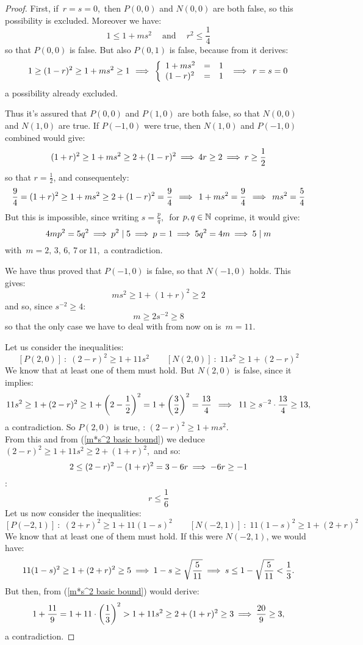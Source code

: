 \begin{proof}
First, if\, $r = s = 0$,\, then $P(0,0)$ and $N(0,0)$
are both false, so this possibility is excluded.
Moreover we have:
$$
1 \leq 1 + ms^2 \quad\: \textrm{and}
\quad\: r^2 \leq \frac{1}{4}
$$
so that $P(0,0)$ is false.
But also $P(0,1)$ is false, because from it derives:
$$
1 \geq (1 - r)^2 \geq 1 + ms^2 \geq 1 \,\:\Longrightarrow\:\,
\left\{
\begin{array}{lll}
1 + ms^2 & = & 1 \\
(1 - r)^2 & = & 1
\end{array}
\,\:\Longrightarrow\:\,
r = s = 0
\right.
$$
a possibility already excluded.

Thus it's assured that $P(0,0)$ and $P(1,0)$ are both
false, so that $N(0,0)$ and $N(1,0)$ are true.
If $P(-1, 0)$ were true, then $N(1, 0)$ and
$P(-1, 0)$ combined would give:
$$
(1 + r)^2 \geq 1 + ms^2 \geq 2 + (1 - r)^2 \:\Longrightarrow\:
4r \geq 2 \:\Longrightarrow\: r \geq \frac{1}{2}
$$
so that $r = \frac{1}{2}$, and consequentely:
$$
\frac{9}{4} = (1 + r)^2 \geq 1 + ms^2 \geq
2 + (1 - r)^2 = \frac{9}{4} \:\:\Longrightarrow\:\:
1 + ms^2 = \frac{9}{4} \:\:\Longrightarrow\:\: ms^2 = \frac{5}{4}
$$
But this is impossible, since writing
$s = \frac{p}{q},\,$ for $p, q \in \mathbb{N}$ coprime,
it would give:
$$
4mp^2 = 5q^2 \:\Longrightarrow\: p^2 \mid 5 \:\Longrightarrow\: p = 1
\:\Longrightarrow\: 5q^2 = 4m \:\Longrightarrow\: 5 \mid m
$$
with\, $m = 2,\, 3,\, 6,\, 7\ \textrm{or}\ 11$,\,
a contradiction.

We have thus proved that $P(-1, 0)$ is false, so that
$N(-1, 0)$ holds. This gives:
%
\begin{equation}\label{m*s^2 basic bound}
ms^2 \geq 1 + (1 + r)^2 \geq 2
\end{equation}
and so, since $s^{-2} \geq 4$:
$$ m \geq 2s^{-2} \geq 8 $$
so that the only case we have to deal with from now on
is\, $m = 11$.

Let us consider the inequalities:
$$
\left[P(2,0)\right]\::\; (2 - r)^2 \geq 1 + 11s^2
\quad\quad
\left[N(2,0)\right]\::\; 11s^2 \geq 1 + (2 - r)^2
$$
We know that at least one of them must hold.
But $N(2,0)$ is false, since it implies:
$$
11s^2 \geq 1 + (2 - r)^2 \geq 1 + \left(2 - \frac{1}{2}\right)^2
= 1 + \left(\frac{3}{2}\right)^2 = \frac{13}{4}
\;\:\Longrightarrow\:\; 11 \geq s^{-2}\cdot \frac{13}{4} \geq 13,
$$
a contradiction. So $P(2,0)$ is true, \ie:\:
$(2 - r)^2 \geq 1 +ms^2$.\\
From this and from (\ref{m*s^2 basic bound}) we deduce\,
$(2 - r)^2 \geq 1 + 11s^2 \geq 2 + (1 + r)^2$,\, and so:
$$
2 \leq (2 - r)^2 - (1 + r)^2 = 3 - 6r \:\Longrightarrow\: - 6r \geq -1
$$
\ie:
\begin{equation}\label{r_upper_bound_1}
r \leq \frac{1}{6}
\end{equation}
%
Let us now consider the inequalities:
$$
\left[P(-2,1)\right]\::\; (2 + r)^2 \geq 1 + 11(1 - s)^2
\quad\quad
\left[N(-2,1)\right]\::\; 11(1 - s)^2 \geq 1 + (2 + r)^2
$$
We know that at least one of them must hold.
If this were $N(-2, 1)$, we would have:
$$
11(1 - s)^2 \geq 1 + (2 + r)^2 \geq 5 \:\Longrightarrow\:
1 - s \geq \sqrt{\frac{5}{11}} \:\Longrightarrow\:
s \leq 1 - \sqrt{\frac{5}{11}} < \frac{1}{3}.
$$
\medskip
But then, from (\ref{m*s^2 basic bound}) would derive:
$$
1 + \frac{11}{9}= 1 + 11 \cdot \left(\frac{1}{3}\right)^2 >
1 + 11s^2 \geq 2 + (1 + r)^2 \geq 3
\:\Longrightarrow\: \frac{20}{9} \geq 3,
$$
a contradiction.


\end{proof}
